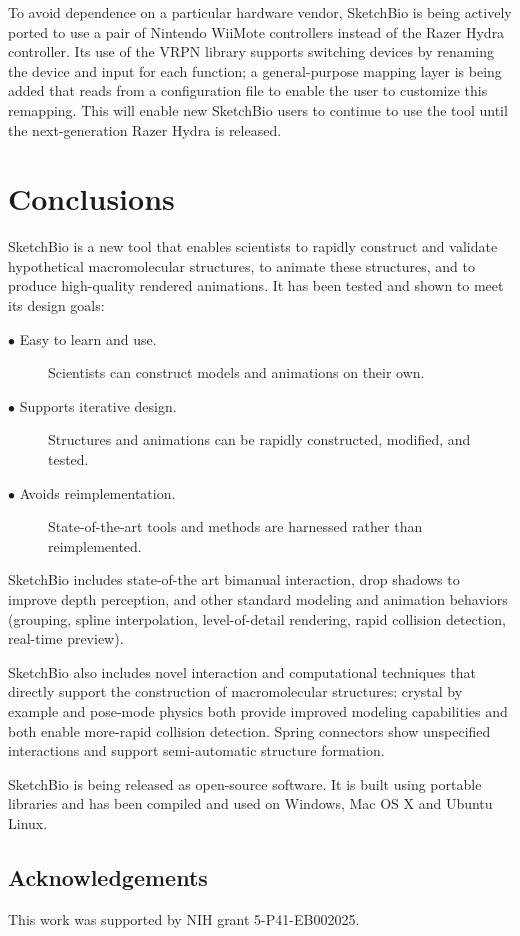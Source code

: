 \documentclass[twocolumn]{bmcart}%
\begin{document}
To avoid dependence on a particular hardware vendor, SketchBio is being actively ported to use a pair of Nintendo WiiMote controllers instead of the Razer Hydra controller.
Its use of the VRPN library supports switching devices by renaming the device and input for each function; a general-purpose mapping layer is being added that reads from a configuration file to enable the user to customize this remapping.
This will enable new SketchBio users to continue to use the tool until the next-generation Razer Hydra is released.

\section*{Conclusions}
SketchBio is a new tool that enables scientists to rapidly construct and validate hypothetical macromolecular structures, to animate these structures, and to produce high-quality rendered animations.
It has been tested and shown to meet its design goals:
\begin{description}
  \item[$\bullet$ Easy to learn and use.] Scientists can construct models and animations on their own.
  \item[$\bullet$ Supports iterative design.] Structures and animations can be rapidly constructed, modified, and tested.
  \item[$\bullet$ Avoids reimplementation.] State-of-the-art tools and methods are harnessed rather than reimplemented.
\end{description}

SketchBio includes state-of-the art bimanual interaction, drop shadows to improve depth perception, and other standard modeling and animation behaviors (grouping, spline interpolation, level-of-detail rendering, rapid collision detection, real-time preview).

SketchBio also includes novel interaction and computational techniques that directly support the construction of macromolecular structures: crystal by example and pose-mode physics both provide improved modeling capabilities and both enable more-rapid collision detection.
Spring connectors show unspecified interactions and support semi-automatic structure formation.

SketchBio is being released as open-source software.
It is built using portable libraries and has been compiled and used on Windows, Mac OS X and Ubuntu Linux.

\subsection*{Acknowledgements}
This work was supported by NIH grant 5-P41-EB002025.
\end{document}
